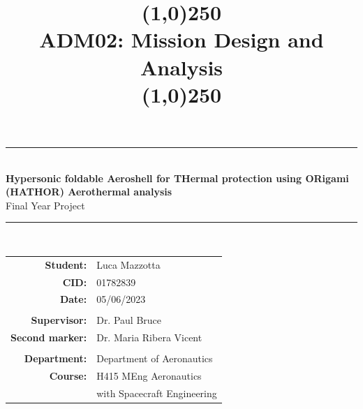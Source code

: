 \begin{titlepage}
\vspace*{-2cm}
\centerline{}
\vspace{2cm}

\centering

\vspace{-2cm}

\newcommand{\HRule}{\rule{\linewidth}{0.5mm}} %
 
\center %
 
 
 
 
 
\HRule \\[0.4cm]
{ \huge \bfseries Hypersonic foldable Aeroshell for THermal protection using ORigami (HATHOR) Aerothermal analysis}\\[0.4cm] %
{\large Final Year Project}
\HRule \\[3cm]
 
\title{\line(1,0){250}\\ADM02: Mission Design and Analysis\\\line(1,0){250}}
\vspace{-2.5cm} 

\vspace{0.5cm}
\begin{tabular}{rl}
\centering
{\bf Student:} & Luca Mazzotta
\\
{\bf CID:} & 01782839
\\
{\bf    Date:} & {05/06/2023}
\\
\\
{\bf Supervisor:} & Dr. Paul Bruce
\\
{\bf Second marker:} & Dr. Maria Ribera Vicent
\\
\\
{\bf Department:} & {Department of Aeronautics}  
\\
{\bf    Course:} & {H415 MEng Aeronautics}
\\
{} & {with Spacecraft Engineering}  



\end{tabular}
\end{titlepage}
